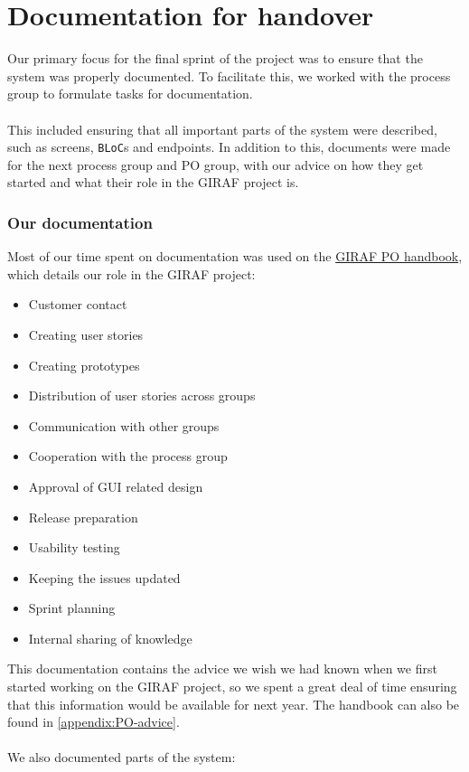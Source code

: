 \section{Documentation for handover}
Our primary focus for the final sprint of the project was to ensure that the system was properly documented.
To facilitate this, we worked with the process group to formulate tasks for documentation.
\\\\
This included ensuring that all important parts of the system were described, such as screens, \texttt{BLoC}s and endpoints.
In addition to this, documents were made for the next process group and PO group, with our advice on how they get started and what their role in the GIRAF project is.

\subsubsection{Our documentation}
Most of our time spent on documentation was used on the \href{https://github.com/aau-giraf/wiki/blob/master/advice_for_future_giraf/PO_advice.md}{GIRAF PO handbook}, which details our role in the GIRAF project:

\begin{itemize}
    \item Customer contact
    \item Creating user stories 
    \item Creating prototypes
    \item Distribution of user stories across groups
    \item Communication with other groups
    \item Cooperation with the process group
    \item Approval of GUI related design
    \item Release preparation
    \item Usability testing
    \item Keeping the issues updated
    \item Sprint planning
    \item Internal sharing of knowledge
\end{itemize}
\noindent
This documentation contains the advice we wish we had known when we first started working on the GIRAF project, so we spent a great deal of time ensuring that this information would be available for next year.
The handbook can also be found in \autoref{appendix:PO-advice}.
\\\\
We also documented parts of the system:

